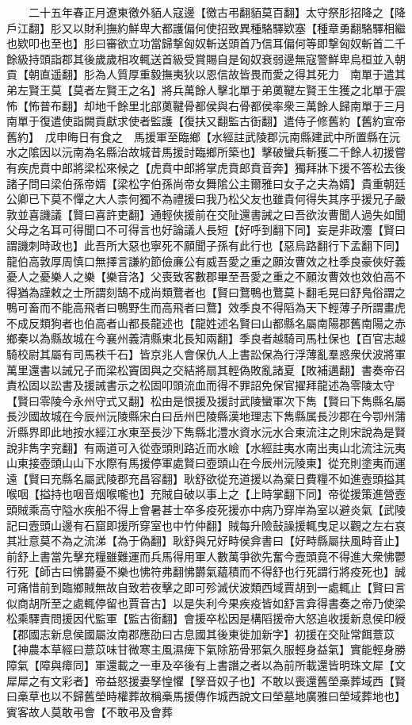 　　二十五年春正月遼東徼外貊人寇邊【徼古弔翻貊莫百翻】太守祭肜招降之【降戶江翻】肜又以財利撫約鮮卑大都護偏何使招致異種駱驛欵塞【種章勇翻駱驛相繼也欵叩也至也】肜曰審欲立功當歸撃匈奴斬送頭首乃信耳偏何等即撃匈奴斬首二千餘級持頭詣郡其後歲歲相攻輒送首級受賞賜自是匈奴衰弱邊無寇警鮮卑烏桓並入朝貢【朝直遥翻】肜為人質厚重毅撫夷狄以恩信故皆畏而愛之得其死力　南單于遣其弟左賢王莫【莫者左賢王之名】將兵萬餘人擊北單于弟薁鞬左賢王生獲之北單于震怖【怖普布翻】却地千餘里北部薁鞬骨都侯與右骨都侯率衆三萬餘人歸南單于三月南單于復遣使詣闕貢獻求使者監護【復扶又翻監古衘翻】遣侍子修舊約【舊約宣帝舊約】　戊申晦日有食之　馬援軍至臨鄉【水經註武陵郡沅南縣建武中所置縣在沅水之隂因以沅南為名縣治故城昔馬援討臨鄉所築也】擊破蠻兵斬獲二千餘人初援嘗有疾虎賁中郎將梁松來候之【虎賁中郎將掌虎賁郎賁音奔】獨拜牀下援不答松去後諸子問曰梁伯孫帝婿【梁松字伯孫尚帝女舞隂公主爾雅曰女子之夫為婿】貴重朝廷公卿已下莫不憚之大人柰何獨不為禮援曰我乃松父友也雖貴何得失其序乎援兄子嚴敦並喜譏議【賢曰喜許吏翻】通輕俠援前在交阯還書誡之曰吾欲汝曹聞人過失如聞父母之名耳可得聞口不可得言也好論議人長短【好呼到翻下同】妄是非政灋【賢曰謂譏刺時政也】此吾所大惡也寧死不願聞子孫有此行也【惡烏路翻行下孟翻下同】龍伯高敦厚周慎口無擇言謙約節儉亷公有威吾愛之重之願汝曹效之杜季良豪俠好義憂人之憂樂人之樂【樂音洛】父喪致客數郡畢至吾愛之重之不願汝曹效也效伯高不得猶為謹敕之士所謂刻鵠不成尚類鶩者也【賢曰鶩鴨也鶩莫卜翻毛晃曰舒鳬俗謂之鴨可畜而不能高飛者曰鴨野生而高飛者曰鶩】效季良不得䧟為天下輕薄子所謂畫虎不成反類狗者也伯高者山都長龍述也【龍姓述名賢曰山都縣名屬南陽郡舊南陽之赤鄉秦以為縣故城在今襄州義清縣東北長知兩翻】季良者越騎司馬杜保也【百官志越騎校尉其屬有司馬秩千石】皆京兆人會保仇人上書訟保為行浮薄亂羣惑衆伏波將軍萬里還書以誡兄子而梁松竇固與之交結將扇其輕偽敗亂諸夏【敗補邁翻】書奏帝召責松固以訟書及援誡書示之松固叩頭流血而得不罪詔免保官擢拜龍述為零陵太守【賢曰零陵今永州守式又翻】松由是恨援及援討武陵蠻軍次下雋【賢曰下雋縣名屬長沙國故城在今辰州沅陵縣宋白曰岳州巴陵縣漢地理志下雋縣属長沙郡在今卾州蒲沂縣界即此地按水經江水東至長沙下雋縣北澧水資水沅水合東流注之則宋說為是賢說非雋字兖翻】有兩道可入從壺頭則路近而水嶮【水經註夷水南出夷山北流注沅夷山東接壺頭山山下水際有馬援停軍處賢曰壺頭山在今辰州沅陵東】從充則塗夷而運遠【賢曰充縣名屬武陵郡充昌容翻】耿舒欲從充道援以為棄日費糧不如進壼頭搤其喉咽【搤持也咽音烟喉嚨也】充賊自破以事上之【上時掌翻下同】帝從援策進營壼頭賊乘高守隘水疾船不得上會暑甚士卒多疫死援亦中病乃穿岸為室以避炎氣【武陵記曰壼頭山邊有石窟即援所穿室也中竹仲翻】賊每升險鼔譟援輒曳足以觀之左右哀其壯意莫不為之流涕【為于偽翻】耿舒與兄好畤侯弇書曰【好畤縣屬扶風畤音止】前舒上書當先擊充糧雖難運而兵馬得用軍人數萬爭欲先奮今壼頭竟不得進大衆怫鬱行死【師古曰怫欝憂不樂也怫符弗翻怫欝氣藴積而不得舒也行死謂行將疫死也】誠可痛惜前到臨鄉賊無故自致若夜擊之即可殄滅伏波類西域賈胡到一處輒止【賢曰言似商胡所至之處輒停留也賈音古】以是失利今果疾疫皆如舒言弇得書奏之帝乃使梁松乘驛責問援因代監軍【監古銜翻】會援卒松因是構䧟援帝大怒追收援新息侯印綬【郡國志新息侯國屬汝南郡應劭曰古息國其後東徙加新字】初援在交阯常餌薏苡【神農本草經曰薏苡味甘微寒主風濕痺下氣除筋骨邪氣久服輕身益氣】實能輕身勝障氣【障與瘴同】軍還載之一車及卒後有上書譖之者以為前所載還皆明珠文犀【文犀犀之有文彩者】帝益怒援妻孥惶懼【孥音奴子也】不敢以喪還舊塋槀葬域西【賢曰槀草也以不歸舊塋時權葬故稱槀馬援傳作城西說文曰塋墓地廣雅曰塋域葬地也】賓客故人莫敢弔會【不敢弔及會葬